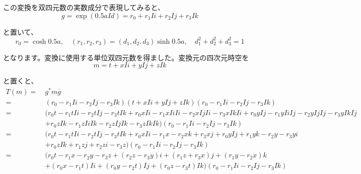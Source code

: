 \documentclass[a4paper,12pt,notitlepage]{jsreport}
\begin{document}
この変換を双四元数の実数成分で表現してみると、
\begin{equation}
  g=\exp(0.5aId)=r_0+r_1Ii+r_2Ij+r_3Ik
\end{equation}

と置いて、
\begin{equation}
  r_0=\cosh 0.5a,\quad (r_1,r_2,r_3)=(d_1,d_2,d_3)\sinh 0.5a,\quad d_1^2+d_2^2+d_3^2=1
\end{equation}

となります。変換に使用する単位双四元数を得ました。変換元の四次元時空を
\begin{equation}
  m=t+xIi+yIj+zIk
\end{equation}

と置くと、
\begin{equation}
  \begin{split}
    T(m)=~&g^*m\overline{g}\\
    =~&(r_0-r_1Ii-r_2Ij-r_3Ik)(t+xIi+yIj+zIk)(r_0-r_1Ii-r_2Ij-r_3Ik)\\
    =~&(r_0t-r_1tIi-r_2tIj-r_3tIk+r_0xIi-r_1xIiIi-r_2xIjIi-r_3xIkIi+r_0yIj-r_1yIiIj-r_2yIjIj-r_3yIkIj\\
    &+r_0zIk-r_1zIiIk-r_2zIjIk-r_3zIkIk)(r_0-r_1Ii-r_2Ij-r_3Ik)\\
    =~&(r_0t-r_1tIi-r_2tIj-r_3tIk+r_0xIi-r_1x-r_2xk+r_3xj+r_0yIj+r_1yk-r_2y-r_3yi\\
    &+r_0zIk+r_1zj+r_2zi-r_3z)(r_0-r_1Ii-r_2Ij-r_3Ik)\\
    =~&(r_0t-r_1x-r_2y-r_3z+(r_2z-r_3y)i+(r_1z+r_3x)j+(r_1y-r_2x)k\\
    &+(r_0x-r_1t)Ii+(r_0y-r_2t)Ij+(r_0z-r_3t)Ik)(r_0-r_1Ii-r_2Ij-r_3Ik)\\
  \end{split}
\end{equation}
\end{document}
